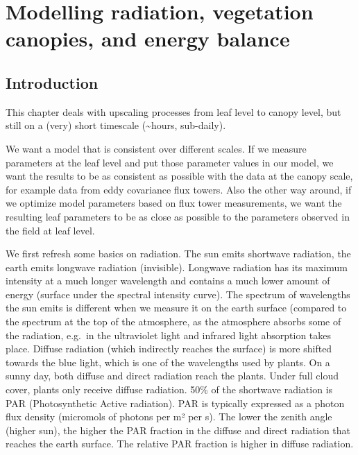 \documentclass[12pt,oneside]{book}
\begin{document}
\chapter{Modelling radiation, vegetation canopies, and energy
balance}\label{modelling-radiation-vegetation-canopies-and-energy-balance}


\section{Introduction}\label{introduction}

This chapter deals with upscaling processes from leaf level to canopy
level, but still on a (very) short timescale (\textasciitilde{}hours,
sub-daily).

We want a model that is consistent over different scales. If we measure
parameters at the leaf level and put those parameter values in our
model, we want the results to be as consistent as possible with the data
at the canopy scale, for example data from eddy covariance flux towers.
Also the other way around, if we optimize model parameters based on flux
tower measurements, we want the resulting leaf parameters to be as close
as possible to the parameters observed in the field at leaf level.

We first refresh some basics on radiation. The sun emits shortwave
radiation, the earth emits longwave radiation (invisible). Longwave
radiation has its maximum intensity at a much longer wavelength and
contains a much lower amount of energy (surface under the spectral
intensity curve). The spectrum of wavelengths the sun emits is different
when we measure it on the earth surface (compared to the spectrum at the
top of the atmosphere, as the atmosphere absorbs some of the radiation,
e.g.~in the ultraviolet light and infrared light absorption takes place.
Diffuse radiation (which indirectly reaches the surface) is more shifted
towards the blue light, which is one of the wavelengths used by plants.
On a sunny day, both diffuse and direct radiation reach the plants.
Under full cloud cover, plants only receive diffuse radiation. 50\% of
the shortwave radiation is PAR (Photosynthetic Active radiation). PAR is
typically expressed as a photon flux density (micromols of photons per
m² per s). The lower the zenith angle (higher sun), the higher the PAR
fraction in the diffuse and direct radiation that reaches the earth
surface. The relative PAR fraction is higher in diffuse radiation.
\end{document}
